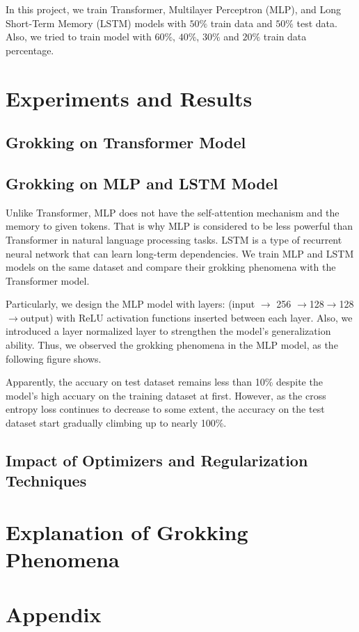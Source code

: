 \documentclass{article}
\begin{document}
In this project, we train Transformer, Multilayer Perceptron (MLP), and Long Short-Term Memory (LSTM) models with $50\%$ train data and $50\%$ test data. Also, we tried to train model with $60\%$, $40\%$, $30\%$ and $20\%$ train data percentage.

\section{Experiments and Results}

\subsection{Grokking on Transformer Model}

\subsection{Grokking on MLP and LSTM Model}

Unlike Transformer, MLP does not have the self-attention mechanism and the memory to given tokens. That is why MLP is considered to be less powerful than Transformer in natural language processing tasks. LSTM is a type of recurrent neural network that can learn long-term dependencies. We train MLP and LSTM models on the same dataset and compare their grokking phenomena with the Transformer model.

Particularly, we design the MLP model with layers: (input $\rightarrow$ 256 $\rightarrow $128$ \rightarrow $128$ \rightarrow $output) with ReLU activation functions inserted between each layer. Also, we introduced a layer normalized layer to strengthen the model's generalization ability. Thus, we observed the grokking phenomena in the MLP model, as the following figure shows.


Apparently, the accuary on test dataset remains less than 10\% despite the model's high accuary on the training dataset at first. However, as the cross entropy loss continues to decrease to some extent, the accuracy on the test dataset start gradually climbing up to nearly 100\%.

\subsection{Impact of Optimizers and Regularization Techniques}

\section{Explanation of Grokking Phenomena}

\appendix

\section{Appendix}
\end{document}
